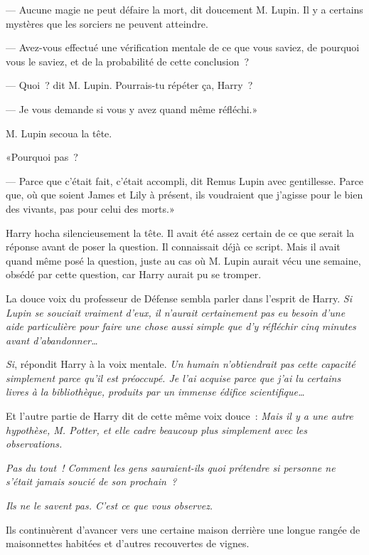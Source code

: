--- Aucune magie ne peut défaire la mort, dit doucement M. Lupin. Il y a certains mystères que les sorciers ne peuvent atteindre.

--- Avez-vous effectué une vérification mentale de ce que vous saviez, de pourquoi vous le saviez, et de la probabilité de cette conclusion~?

--- Quoi~? dit M. Lupin. Pourrais-tu répéter ça, Harry~?

--- Je vous demande si vous y avez quand même réfléchi.»

M. Lupin secoua la tête.

«Pourquoi pas~?

--- Parce que c'était fait, c'était accompli, dit Remus Lupin avec gentillesse. Parce que, où que soient James et Lily à présent, ils voudraient que j'agisse pour le bien des vivants, pas pour celui des morts.»

Harry hocha silencieusement la tête. Il avait été assez certain de ce que serait la réponse avant de poser la question. Il connaissait déjà ce script. Mais il avait quand même posé la question, juste au cas où M. Lupin aurait vécu une semaine, obsédé par cette question, car Harry aurait pu se tromper.

La douce voix du professeur de Défense sembla parler dans l'esprit de Harry. \emph{Si Lupin se souciait vraiment d'eux, il n'aurait certainement pas eu besoin d'une aide particulière pour faire une chose aussi simple que d'y réfléchir cinq minutes avant d'abandonner…}

\emph{Si}, répondit Harry à la voix mentale. \emph{Un humain n'obtiendrait pas cette capacité simplement parce qu'il est préoccupé. Je l'ai acquise parce que j'ai lu certains livres à la bibliothèque, produits par un immense édifice scientifique…}

Et l'autre partie de Harry dit de cette même voix douce~: \emph{Mais il y a une autre hypothèse, M. Potter, et elle cadre beaucoup plus simplement avec les observations.}

\emph{Pas du tout~! Comment les gens sauraient-ils quoi prétendre si personne ne s'était jamais soucié de son prochain~?}

\emph{Ils ne le savent pas. C'est ce que vous observez.}

Ils continuèrent d'avancer vers une certaine maison derrière une longue rangée de maisonnettes habitées et d'autres recouvertes de vignes.

